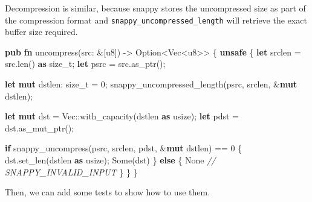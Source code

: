 \documentclass[a4paper,]{book}
\newenvironment{Shaded}{\begin{snugshade}}{\end{snugshade}}
\newcommand{\KeywordTok}[1]{\textcolor[rgb]{0.13,0.29,0.53}{\textbf{{#1}}}}
\newcommand{\DataTypeTok}[1]{\textcolor[rgb]{0.13,0.29,0.53}{{#1}}}
\newcommand{\DecValTok}[1]{\textcolor[rgb]{0.00,0.00,0.81}{{#1}}}
\newcommand{\ConstantTok}[1]{\textcolor[rgb]{0.00,0.00,0.00}{{#1}}}
\newcommand{\CommentTok}[1]{\textcolor[rgb]{0.56,0.35,0.01}{\textit{{#1}}}}
\newcommand{\NormalTok}[1]{{#1}}
\begin{document}
Decompression is similar, because snappy stores the uncompressed size as
part of the compression format and \texttt{snappy\_uncompressed\_length}
will retrieve the exact buffer size required.

\begin{Shaded}
\begin{Highlighting}[]
\KeywordTok{pub} \KeywordTok{fn} \NormalTok{uncompress(src: &[}\DataTypeTok{u8}\NormalTok{]) -> }\DataTypeTok{Option}\NormalTok{<}\DataTypeTok{Vec}\NormalTok{<}\DataTypeTok{u8}\NormalTok{>> \{}
    \KeywordTok{unsafe} \NormalTok{\{}
        \KeywordTok{let} \NormalTok{srclen = src.len() }\KeywordTok{as} \DataTypeTok{size_t}\NormalTok{;}
        \KeywordTok{let} \NormalTok{psrc = src.as_ptr();}

        \KeywordTok{let} \KeywordTok{mut} \NormalTok{dstlen: }\DataTypeTok{size_t} \NormalTok{= }\DecValTok{0}\NormalTok{;}
        \NormalTok{snappy_uncompressed_length(psrc, srclen, &}\KeywordTok{mut} \NormalTok{dstlen);}

        \KeywordTok{let} \KeywordTok{mut} \NormalTok{dst = }\DataTypeTok{Vec}\NormalTok{::with_capacity(dstlen }\KeywordTok{as} \DataTypeTok{usize}\NormalTok{);}
        \KeywordTok{let} \NormalTok{pdst = dst.as_mut_ptr();}

        \KeywordTok{if} \NormalTok{snappy_uncompress(psrc, srclen, pdst, &}\KeywordTok{mut} \NormalTok{dstlen) == }\DecValTok{0} \NormalTok{\{}
            \NormalTok{dst.set_len(dstlen }\KeywordTok{as} \DataTypeTok{usize}\NormalTok{);}
            \ConstantTok{Some}\NormalTok{(dst)}
        \NormalTok{\} }\KeywordTok{else} \NormalTok{\{}
            \ConstantTok{None} \CommentTok{// SNAPPY_INVALID_INPUT}
        \NormalTok{\}}
    \NormalTok{\}}
\NormalTok{\}}
\end{Highlighting}
\end{Shaded}

Then, we can add some tests to show how to use them.
\end{document}
